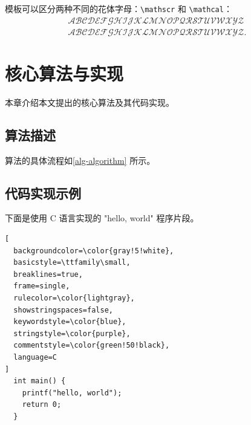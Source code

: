 \documentclass{sysuthesis}
\begin{document}
模板可以区分两种不同的花体字母：\verb|\mathscr| 和 \verb|\mathcal|：
\begin{gather*}
  \mathscr{A} \mathscr{B} \mathscr{C} \mathscr{D} \mathscr{E} \mathscr{F} \mathscr{G} \mathscr{H} \mathscr{I} \mathscr{J} \mathscr{K} \mathscr{L} \mathscr{M} \mathscr{N} \mathscr{O} \mathscr{P} \mathscr{Q} \mathscr{R} \mathscr{S} \mathscr{T} \mathscr{U} \mathscr{V} \mathscr{W} \mathscr{X} \mathscr{Y} \mathscr{Z}\\
  \mathcal{A} \mathcal{B} \mathcal{C} \mathcal{D} \mathcal{E} \mathcal{F} \mathcal{G} \mathcal{H} \mathcal{I} \mathcal{J} \mathcal{K} \mathcal{L} \mathcal{M} \mathcal{N} \mathcal{O} \mathcal{P} \mathcal{Q} \mathcal{R} \mathcal{S} \mathcal{T} \mathcal{U} \mathcal{V} \mathcal{W} \mathcal{X} \mathcal{Y} \mathcal{Z}.
\end{gather*}

\chapter{核心算法与实现}

本章介绍本文提出的核心算法及其代码实现。

\section{算法描述}

算法的具体流程如\autoref{alg-algorithm} 所示。

\begin{algorithm}[H]
  \caption{算法流程示例}
  \label{alg-algorithm}
\end{algorithm}

\section{代码实现示例}

下面是使用 C 语言实现的 "hello, world" 程序片段。


\begin{lstlisting}[
  backgroundcolor=\color{gray!5!white},
  basicstyle=\ttfamily\small,
  breaklines=true,
  frame=single,
  rulecolor=\color{lightgray},
  showstringspaces=false,
  keywordstyle=\color{blue},
  stringstyle=\color{purple},
  commentstyle=\color{green!50!black},
  language=C
]
  int main() {
    printf("hello, world");
    return 0;
  }
\end{lstlisting}
\end{document}
